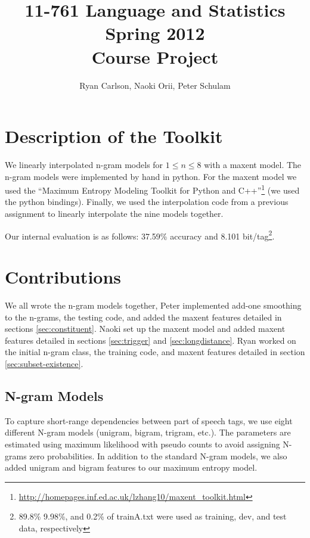 \documentclass[11pt]{article}
\begin{document}
 

\title{{11-761 Language and Statistics\\Spring 2012\\Course Project}}
\author{Ryan Carlson, Naoki Orii, Peter Schulam}
\maketitle

\section{Description of the Toolkit}

We linearly interpolated n-gram models for $1 \le n \le 8$ with a maxent model. The n-gram models were implemented by hand in python. For the maxent model we used the ``Maximum Entropy Modeling Toolkit for Python and C++''\footnote{\url{http://homepages.inf.ed.ac.uk/lzhang10/maxent_toolkit.html}} (we used the python bindings). Finally, we used the interpolation code from a previous assignment to linearly interpolate the nine models together.

Our internal evaluation is as follows: 37.59\% accuracy and 8.101 bit/tag\footnote{89.8\%  9.98\%, and 0.2\% of trainA.txt were used as training, dev, and test data, respectively}.

\section{Contributions}

We all wrote the n-gram models together, Peter implemented add-one smoothing to the n-grams, the testing code, and added the maxent features detailed in sections \ref{sec:constituent}. Naoki set up the maxent model and added maxent features detailed in sections \ref{sec:trigger} and \ref{sec:longdistance}. Ryan worked on the initial n-gram class, the training code, and maxent features detailed in section \ref{sec:subset-existence}. 

\subsection{N-gram Models}

To capture short-range dependencies between part of speech tags, we use
eight different N-gram models (unigram, bigram, trigram, etc.). The
parameters are estimated using maximum likelihood with pseudo counts to
avoid assigning N-grams zero probabilities. In addition to the standard
N-gram models, we also added unigram and bigram features to our maximum
entropy model. 
\end{document}
